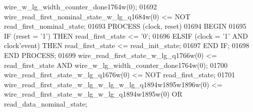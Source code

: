\begin{DoxyCode}
{{      wire_w_lg_width_counter_done1764w}\textcolor{vhdlchar}{(}\textcolor{vhdllogic}{}\textcolor{vhdllogic}{0}\textcolor{vhdlchar}{)};
01692     \textcolor{vhdlchar}{wire_read_first_nominal_state_w_lg_q1684w}\textcolor{vhdlchar}{(}\textcolor{vhdllogic}{}\textcolor{vhdllogic}{0}\textcolor{vhdlchar}{)} \textcolor{vhdlchar}{<=} \textcolor{keywordflow}{NOT} \textcolor{vhdlchar}{read_first_nominal_state};
01693     \textcolor{keywordflow}{PROCESS} (clock, reset)
01694 \textcolor{vhdlkeyword}{    BEGIN}
01695         \textcolor{keywordflow}{IF} \textcolor{vhdlchar}{(}\textcolor{vhdlchar}{reset} \textcolor{vhdlchar}{=} \textcolor{vhdlchar}{'}\textcolor{vhdllogic}{}\textcolor{vhdllogic}{1}\textcolor{vhdlchar}{'}\textcolor{vhdlchar}{)} \textcolor{keywordflow}{THEN} \textcolor{vhdlchar}{read_first_state} \textcolor{vhdlchar}{<=} \textcolor{vhdlchar}{'}\textcolor{vhdllogic}{}\textcolor{vhdllogic}{0}\textcolor{vhdlchar}{'};
01696         \textcolor{keywordflow}{ELSIF} \textcolor{vhdlchar}{(}\textcolor{vhdlchar}{clock} \textcolor{vhdlchar}{=} \textcolor{vhdlchar}{'}\textcolor{vhdllogic}{}\textcolor{vhdllogic}{1}\textcolor{vhdlchar}{'} \textcolor{keywordflow}{AND} \textcolor{vhdlchar}{clock}\textcolor{vhdlchar}{'}\textcolor{vhdlkeyword}{event}\textcolor{vhdlchar}{)} \textcolor{keywordflow}{THEN} \textcolor{vhdlchar}{read_first_state} \textcolor{vhdlchar}{<=} \textcolor{vhdlchar}{
      read_init_state};
01697         \textcolor{keywordflow}{END} \textcolor{keywordflow}{IF};
01698     \textcolor{keywordflow}{END} \textcolor{keywordflow}{PROCESS};
01699     \textcolor{vhdlchar}{wire_read_first_state_w_lg_q1766w}\textcolor{vhdlchar}{(}\textcolor{vhdllogic}{}\textcolor{vhdllogic}{0}\textcolor{vhdlchar}{)} \textcolor{vhdlchar}{<=} \textcolor{vhdlchar}{read_first_state} \textcolor{keywordflow}{AND} \textcolor{vhdlchar}{
      wire_w_lg_width_counter_done1764w}\textcolor{vhdlchar}{(}\textcolor{vhdllogic}{}\textcolor{vhdllogic}{0}\textcolor{vhdlchar}{)};
01700     \textcolor{vhdlchar}{wire_read_first_state_w_lg_q1676w}\textcolor{vhdlchar}{(}\textcolor{vhdllogic}{}\textcolor{vhdllogic}{0}\textcolor{vhdlchar}{)} \textcolor{vhdlchar}{<=} \textcolor{keywordflow}{NOT} \textcolor{vhdlchar}{read_first_state};
01701     \textcolor{vhdlchar}{wire_read_first_state_w_lg_w_lg_w_lg_q1894w1895w1896w}\textcolor{vhdlchar}{(}\textcolor{vhdllogic}{}\textcolor{vhdllogic}{0}\textcolor{vhdlchar}{)} \textcolor{vhdlchar}{<=} \textcolor{vhdlchar}{
      wire_read_first_state_w_lg_w_lg_q1894w1895w}\textcolor{vhdlchar}{(}\textcolor{vhdllogic}{}\textcolor{vhdllogic}{0}\textcolor{vhdlchar}{)} \textcolor{keywordflow}{OR} \textcolor{vhdlchar}{read_data_nominal_state};
}
\end{DoxyCode}
